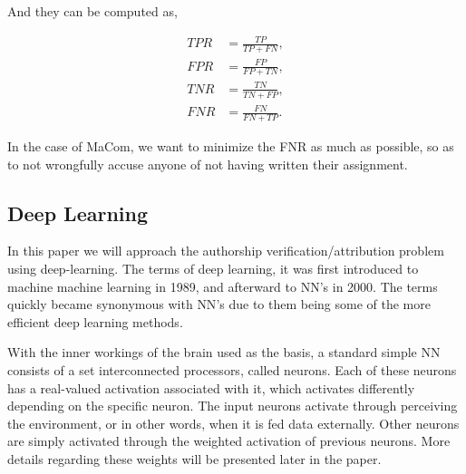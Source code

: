 And they can be computed as,

\begin{align}
    TPR &= \frac{TP}{TP + FN}, \\
    FPR &= \frac{FP}{FP + TN}, \\
    TNR &= \frac{TN}{TN + FP}, \\
    FNR &= \frac{FN}{FN + TP}.
\end{align}

In the case of MaCom, we want to minimize the \gls{FNR} as much as possible, so
as to not wrongfully accuse anyone of not having written their assignment.


\subsection{Deep Learning}

In this paper we will approach the authorship verification/attribution problem
using deep-learning. The terms of deep learning, it was first introduced to
machine machine learning in 1989, and afterward to \gls{NN}'s in 2000. The terms
quickly became synonymous with \gls{NN}'s due to them being some of the more
efficient deep learning methods.\cite{Schmidhuber:2015}

With the inner workings of the brain used as the basis, a standard simple
\gls{NN} consists of a set interconnected processors, called neurons. Each of
these neurons has a real-valued activation associated with it, which activates
differently depending on the specific neuron. The input neurons activate through
perceiving the environment, or in other words, when it is fed data externally.
Other neurons are simply activated through the weighted activation of previous
neurons. More details regarding these weights will be presented later in the
paper.\cite{DBLP:journals/corr/Schmidhuber14}

